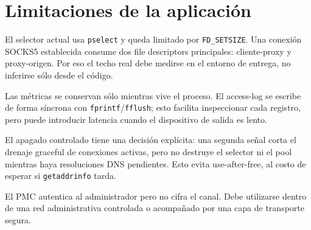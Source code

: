 \section{Limitaciones de la aplicación}

El selector actual usa \texttt{pselect} y queda limitado por \texttt{FD\_SETSIZE}.
Una conexión SOCKS5 establecida consume dos file descriptors principales:
cliente-proxy y proxy-origen. Por eso el techo real debe medirse en el entorno
de entrega, no inferirse sólo desde el código.

Las métricas se conservan sólo mientras vive el proceso. El access-log se escribe
de forma síncrona con \texttt{fprintf}/\texttt{fflush}; esto facilita inspeccionar
cada registro, pero puede introducir latencia cuando el dispositivo de salida es
lento.

El apagado controlado tiene una decisión explícita: una segunda señal corta el
drenaje graceful de conexiones activas, pero no destruye el selector ni el pool
mientras haya resoluciones DNS pendientes. Esto evita use-after-free, al costo de
esperar si \texttt{getaddrinfo} tarda.

El PMC autentica al administrador pero no cifra el canal. Debe utilizarse dentro
de una red administrativa controlada o acompañado por una capa de transporte
segura.
